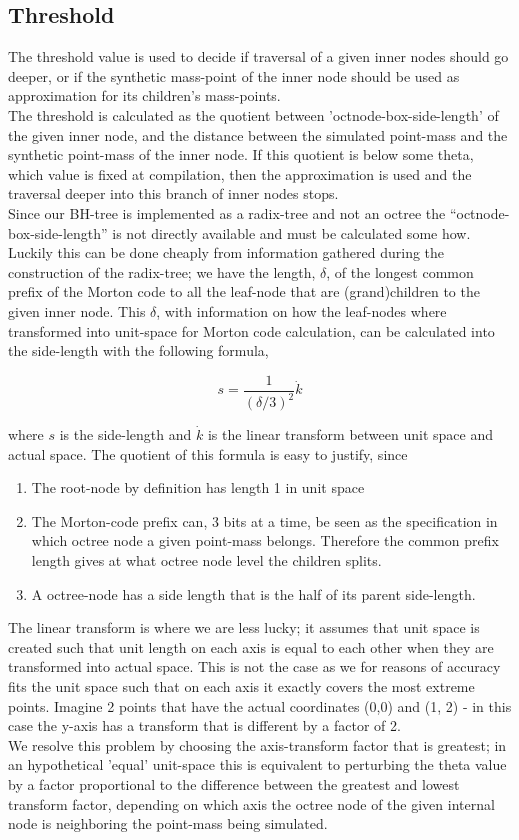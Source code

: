 \subsection{Threshold}
The threshold value is used to decide if traversal of a given inner nodes should go
deeper, or if the synthetic mass-point of the inner node should be used as
approximation for its children's mass-points. \\


The threshold is calculated as the quotient between 'octnode-box-side-length' of
the given inner node, and the distance between the simulated point-mass and the
synthetic point-mass of the inner node. If this quotient is below some theta,
which value is fixed at compilation, then the approximation is used and the
traversal deeper into this branch of inner nodes stops. \\

Since our BH-tree is implemented as a radix-tree and not an octree the
``octnode-box-side-length'' is not directly available and must be calculated some
how. Luckily this can be done cheaply from information gathered during the
construction of the radix-tree; we have the length, $\delta$, of the longest
common prefix of the Morton code to all the leaf-node that are (grand)children
to the given inner node. This $\delta$, with information on how the leaf-nodes
where transformed into unit-space for Morton code calculation, can be calculated
into the side-length with the following formula,

$$s = \frac{1}{(\delta / 3)^2} \dot k$$

where $s$ is the side-length and $\dot k$ is the linear transform between unit
space and actual space. The quotient of this formula is easy to justify, since
\begin{enumerate}
\item The root-node by definition has length 1 in unit space
\item The Morton-code prefix can, 3 bits at a time, be seen as the specification
  in which octree node a given point-mass belongs. Therefore the common prefix length
  gives at what octree node level the children splits.
  \item A octree-node has a side length that is the half of its parent
    side-length.
\end{enumerate}
The linear transform is where we are less lucky; it assumes that unit space is
created such that unit length on each axis is equal to each other when they are
transformed into actual space. This is not the case as we for reasons of accuracy
fits the unit space such that on each axis it exactly covers the most extreme
points. Imagine 2 points that have the actual coordinates (0,0) and (1, 2) - in this
case the y-axis has a transform that is different by a factor of 2. \\

We resolve this problem by choosing the axis-transform factor that is greatest;
in an hypothetical 'equal' unit-space this is equivalent to perturbing the theta
value by a factor proportional to the difference between the greatest and lowest
transform factor, depending on which axis the octree node of the given internal node
is neighboring the point-mass being simulated.


